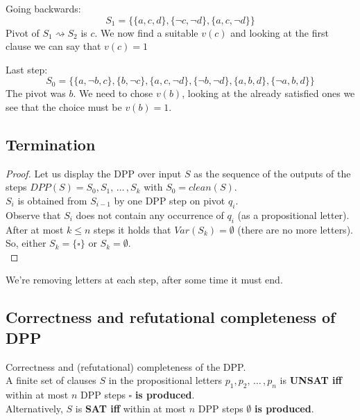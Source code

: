 Going backwards:
$$ S_1 = \{\{a,c,d\}, \{\neg c, \neg d\}, \{a,c,\neg d\}\} $$
Pivot of $S_1 \rightsquigarrow S_2$ is $c$. We now find a suitable $v(c)$ and looking at the first clause we can say that $v(c) = 1$

Last step: 
$$S_0 = \{\{a, \neg b,  c\}, \{b, \neg c\}, \{a, c, \neg d\}, \{\neg b, \neg d\}, \{a,b,d\}, \{\neg a, b, d\}\} $$
The pivot was $b$. We need to chose $v(b)$, looking at the already satisfied ones we see that the choice must be $v(b) = 1$.\\

\newpage

\subsection{Termination}

\begin{proof}
	Let us display the DPP over input $S$ as the sequence of the outputs of the steps $DPP(S) = S_0, S_1, \, \dots \, , S_k$ with $S_0 = clean(S)$. \\
	
	$S_i$ is obtained from $S_{i-1}$ by one DPP step on pivot $q_i$.\\
	
	Observe that $S_i$ does not contain any occurrence of $q_i$ (as a propositional letter).\\
	
	After at most $k \leq n$ steps it holds that $Var(S_k) = \emptyset$ (there are no more letters).\\
	
	So, either $S_k = \{\square\}$ or $S_k = \emptyset$.\\
\end{proof}

We're removing letters at each step, after some time it must end.\\

\newpage


\subsection{Correctness and refutational completeness of DPP}

\begin{theorem}
	Correctness and (refutational) completeness of the DPP. \\
	A finite set of clauses $S$ in the propositional letters $p_1, p_2, \, \dots \, , p_n$ is \textbf{UNSAT iff} within at most $n$ DPP steps $\square$ \textbf{is produced}. \\
	
	Alternatively, $S$ is \textbf{SAT iff} within at most $n$ DPP steps $\emptyset$ \textbf{is produced}.\\
\end{theorem}

